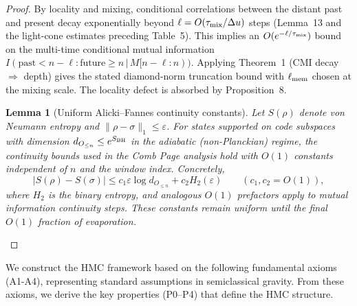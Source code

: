 \documentclass[11pt,a4paper]{article}
\newcommand{\HMC}{\textsc{HMC}\xspace}
\theoremstyle{plain}
\newtheorem{lemma}[theorem]{Lemma}
\theoremstyle{definition}
\theoremstyle{remark}
\begin{document}
\begin{proof}
By locality and mixing, conditional correlations between the distant past and present decay exponentially beyond $\ell=O(\tau_{\rm mix}/\Delta u)$ steps (Lemma~13 and the light-cone estimates preceding Table~5). This implies an $O(e^{-\ell/\tau_{\rm mix}})$ bound on the multi-time conditional mutual information $I(\text{past}{<}n{-}\ell:\text{future}{\ge}n\,|\,M[n{-}\ell{:}n))$. Applying Theorem~1 (CMI decay $\Rightarrow$ depth) gives the stated diamond-norm truncation bound with $\ell_{\rm mem}$ chosen at the mixing scale. The locality defect is absorbed by Proposition~8. 
\begin{lemma}[Uniform Alicki--Fannes continuity constants]\label{lem:af-uniform-constants}
Let $S(\rho)$ denote von Neumann entropy and $\|\rho-\sigma\|_1\le \varepsilon$. For states supported on code subspaces with dimension $d_{O_{\le n}}\le e^{S_{\rm BH}}$ in the adiabatic (non-Planckian) regime, the continuity bounds used in the Comb Page analysis hold with $O(1)$ constants independent of $n$ and the window index. Concretely,
\[
|S(\rho)-S(\sigma)|\le c_1\varepsilon\log d_{O_{\le n}}+c_2 H_2(\varepsilon) \qquad (c_1,c_2=O(1)),
\]
where $H_2$ is the binary entropy, and analogous $O(1)$ prefactors apply to mutual information continuity steps. These constants remain uniform until the final $O(1)$ fraction of evaporation.
\end{lemma}
\end{proof}

We construct the \HMC{} framework based on the following fundamental axioms (A1-A4), representing standard assumptions in semiclassical gravity. From these axioms, we derive the key properties (P0--P4) that define the \HMC{} structure.
\end{document}
